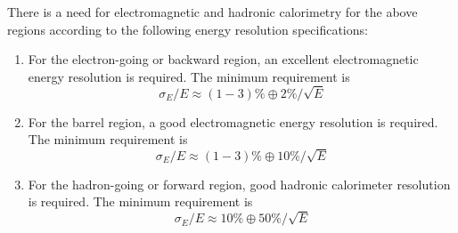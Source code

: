 There is a need for electromagnetic and hadronic calorimetry for the above regions according to the following energy resolution specifications:
\begin{enumerate}
    \item For the electron-going or backward region, an excellent electromagnetic energy resolution is required. The minimum requirement is $$\sigma _E/E \approx (1-3)\% \oplus 2\%/\sqrt{E} $$
    \item For the barrel region, a good electromagnetic energy resolution is required. The minimum requirement is $$\sigma _E/E \approx (1-3)\% \oplus 10\%/\sqrt{E} $$
    \item For the hadron-going or forward region, good hadronic calorimeter resolution is required. The minimum requirement is $$\sigma _E/E \approx 10\% \oplus 50\%/\sqrt{E} $$
\end{enumerate}

